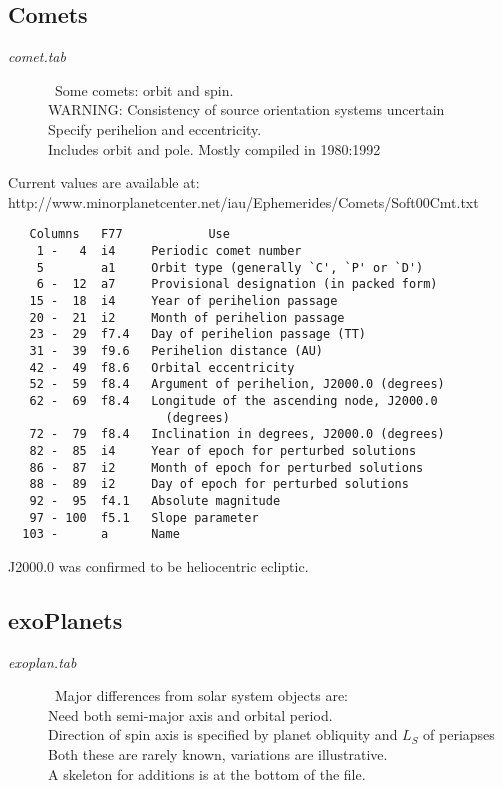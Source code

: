 \documentclass{article}
\newcommand{\qi}{\\ \hspace*{2.em}}      %
\newcommand{\qiii}{\\ \hspace*{6.em}}    %
\begin{document}
\subsection{Comets}

\begin{description} 
 \item [\textit{comet.tab}] \  Some comets: orbit and spin. 
\\ WARNING: Consistency of source orientation systems uncertain
\qi Specify perihelion and eccentricity.
\\ Includes orbit and pole. Mostly compiled in 1980:1992
\end{description}
Current values are available at: 
\qi http://www.minorplanetcenter.net/iau/Ephemerides/Comets/Soft00Cmt.txt
\vspace{-6.mm}
\begin{verbatim}
   Columns   F77            Use
    1 -   4  i4     Periodic comet number
    5        a1     Orbit type (generally `C', `P' or `D')
    6 -  12  a7     Provisional designation (in packed form)
   15 -  18  i4     Year of perihelion passage
   20 -  21  i2     Month of perihelion passage
   23 -  29  f7.4   Day of perihelion passage (TT)
   31 -  39  f9.6   Perihelion distance (AU)
   42 -  49  f8.6   Orbital eccentricity
   52 -  59  f8.4   Argument of perihelion, J2000.0 (degrees)
   62 -  69  f8.4   Longitude of the ascending node, J2000.0
                      (degrees)
   72 -  79  f8.4   Inclination in degrees, J2000.0 (degrees)
   82 -  85  i4     Year of epoch for perturbed solutions
   86 -  87  i2     Month of epoch for perturbed solutions
   88 -  89  i2     Day of epoch for perturbed solutions
   92 -  95  f4.1   Absolute magnitude
   97 - 100  f5.1   Slope parameter
  103 -      a      Name
\end{verbatim}
J2000.0 was confirmed to be heliocentric ecliptic.

\subsection{exoPlanets} %

\begin{description} 
\item [\textit{exoplan.tab}] \ Major differences from solar system objects are:
\qi Need both semi-major axis and orbital period.
\qi Direction of spin axis is specified by planet obliquity and $L_S$ of periapses
\qiii Both these are rarely known, variations are illustrative.
\qi A skeleton for additions is at the bottom of the file.
\end{description}
\end{document}
